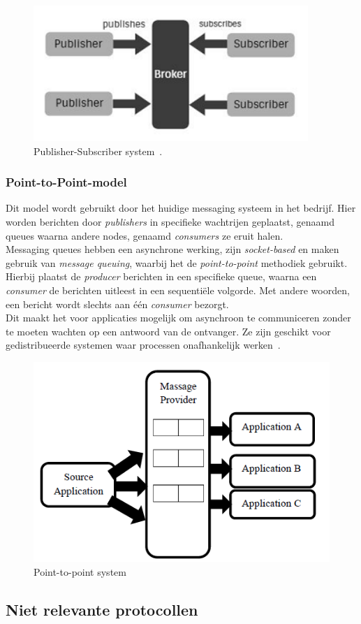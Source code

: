 \begin{figure}[h!]
  \centering
  \includegraphics[width=.4\textwidth]{../voorstel/img/fig1-publish-subscribe.png}
  \caption{\label{fig:pub-sub}Publisher-Subscriber system~\autocite{Sharvari2019}.}
\end{figure}

\subsubsection{Point-to-Point-model}
Dit model wordt gebruikt door het huidige messaging systeem in het bedrijf.
Hier worden berichten door \emph{publishers} in specifieke wachtrijen geplaatst, genaamd queues waarna andere nodes, genaamd \emph{consumers} ze eruit halen. 
\\
Messaging queues hebben een asynchrone werking, zijn \emph{socket-based} en maken gebruik van \emph{message queuing}, 
waarbij het de \emph{point-to-point} methodiek gebruikt.
Hierbij plaatst de \emph{producer} berichten in een specifieke queue, waarna een \emph{consumer} de berichten uitleest in een sequentiële volgorde.
Met andere woorden, een bericht wordt slechts aan één \emph{consumer} bezorgt.
\\
Dit maakt het voor applicaties mogelijk om asynchroon te communiceren zonder te moeten wachten op een antwoord van de ontvanger.
Ze zijn geschikt voor gedistribueerde systemen waar processen onafhankelijk werken~\autocite{Dinari2020}.

\begin{figure}[h!]
  \centering
  \includegraphics[width=.4\textwidth]{../bachproef/img/point-to-point-messaging.png}
  \caption{\label{fig:point-to-point}Point-to-point system~\autocite{Dinari2020}}
\end{figure}

\subsection{Niet relevante protocollen}
